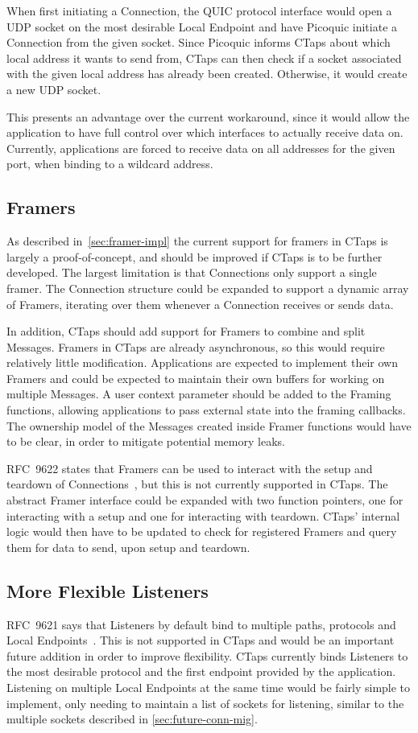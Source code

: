 When first initiating a Connection, the QUIC protocol interface 
would open a UDP socket on the most desirable Local Endpoint
and have Picoquic initiate a Connection from the given socket.
Since Picoquic informs CTaps about which local address it wants
to send from, CTaps can then check if a socket associated with
the given local address has already been created. Otherwise, it would create a new
UDP socket.

This presents an advantage over the current workaround,
since it would allow the application to have full control over
which interfaces to actually receive data on. Currently,
applications are forced to receive data on all addresses for the given port,
when binding to a wildcard address.

\subsection{Framers}\label{sec:future-framer}
As described in~\cref{sec:framer-impl} the current support for framers
in CTaps is largely a proof-of-concept, and should be improved if CTaps
is to be further developed. The largest limitation is that Connections
only support a single framer.
The Connection structure could be
expanded to support a dynamic array of Framers, iterating over them
whenever a Connection receives or sends data.

In addition, CTaps should add support for Framers to combine
and split Messages.
Framers in CTaps are already asynchronous, so this would require relatively little modification.
Applications are expected to implement
their own Framers and could be expected to maintain their own buffers
for working on multiple Messages.
A user context parameter should be added to the Framing functions,
allowing applications to pass external state into the framing callbacks.
The ownership model of the Messages created inside Framer functions would have
to be clear, in order to mitigate potential memory leaks.

RFC~9622 states that Framers can be used to interact
with the setup and teardown of Connections~\cite[sec.~9.1.2]{rfc9622},
but this is not currently supported in CTaps. The abstract Framer
interface could
be expanded with two function pointers, one for
interacting with a setup and one for interacting with
teardown. CTaps' internal logic would then have to
be updated to check for registered Framers and query
them for data to send, upon setup and teardown.

\subsection{More Flexible Listeners}\label{sec:protocol-ag-listener}
RFC~9621 says that Listeners by default bind to multiple paths,
protocols and Local Endpoints~\cite[sec.~4.1.4]{rfc9621}. This
is not supported in CTaps and would be an important future addition
in order to improve flexibility. CTaps currently binds Listeners
to the most desirable protocol and the first endpoint provided by the
application. Listening on multiple Local Endpoints
at the same time would be fairly simple to implement, only needing
to maintain a list of sockets for listening, similar to the multiple sockets described in
\cref{sec:future-conn-mig}.

